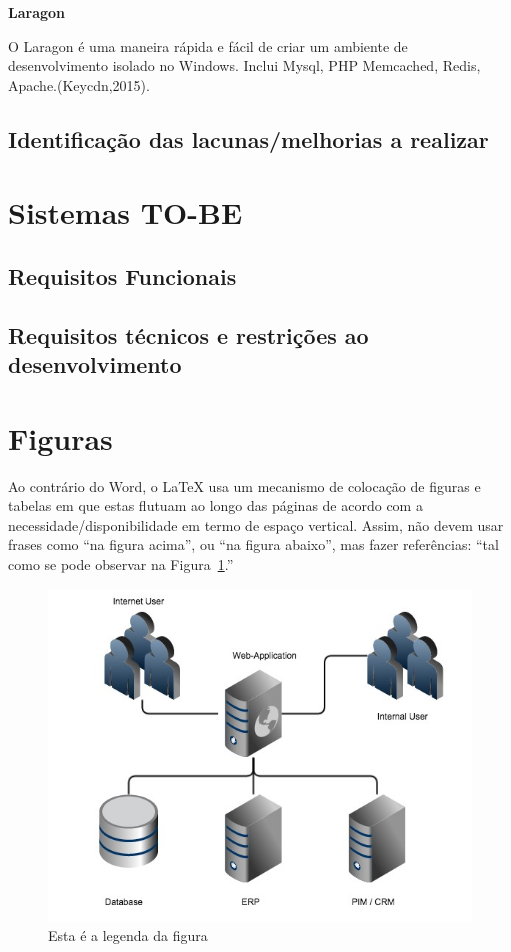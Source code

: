 \textbf{Laragon}

O Laragon é uma maneira rápida e fácil de criar um ambiente de desenvolvimento isolado no Windows. Inclui Mysql, PHP Memcached, Redis, Apache.(Keycdn,2015).\newline

\subsection{Identificação das lacunas/melhorias a realizar}
\section{Sistemas TO-BE}
\subsection{Requisitos Funcionais}
\subsection{Requisitos técnicos e restrições ao desenvolvimento}






\section{Figuras}

Ao contrário do Word, o \LaTeX{} usa um mecanismo de colocação de figuras e tabelas em que estas
flutuam ao longo das páginas de acordo com a necessidade/disponibilidade em termo de espaço vertical.
Assim, não devem usar frases como ``na figura acima'', ou ``na figura abaixo'', mas fazer referências:
``tal como se pode observar na Figura~\ref{fig:1}.''

\begin{figure}[htb]
    \centering
    \includegraphics[width=0.8\linewidth]{images/sample}  %
    \caption{Esta é a legenda da figura}
    \label{fig:1}
\end{figure}

